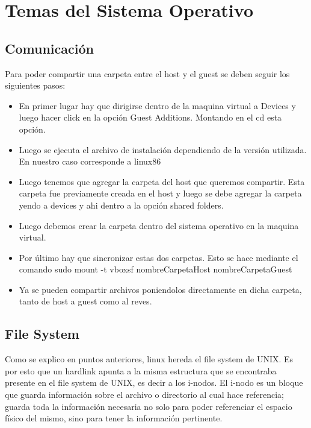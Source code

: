 \documentclass[a4paper, 12pt]{article}
\begin{document}
\section*{Temas del Sistema Operativo}

\subsection*{Comunicaci\'on}

Para poder compartir una carpeta entre el host y el guest se deben seguir los siguientes pasos:

\begin{itemize}
\item En primer lugar hay que dirigirse dentro de la maquina virtual a Devices y luego hacer click en la opci\'on Guest Additions. Montando en el cd esta opci\'on.
\item Luego se ejecuta el archivo de instalaci\'on dependiendo de la versi\'on utilizada. En nuestro caso corresponde a linux86
\item Luego tenemos que agregar la carpeta del host que queremos compartir. Esta carpeta fue previamente creada en el host y luego se debe agregar la carpeta yendo a devices y ahi dentro a la opci\'on shared folders. 
\item Luego debemos crear la carpeta dentro del sistema operativo en la maquina virtual.
\item Por \'ultimo hay que sincronizar estas dos carpetas. Esto se hace mediante el comando sudo mount -t vboxsf nombreCarpetaHost nombreCarpetaGuest
\item Ya se pueden compartir archivos poniendolos directamente en dicha carpeta, tanto de host a guest como al reves. 
\end{itemize}


\subsection*{File System}

Como se explico en puntos anteriores, linux hereda el file system de UNIX. Es por esto que un hardlink apunta a la misma estructura que se encontraba presente en el file system de UNIX, es decir a los i-nodos. El i-nodo es un bloque que guarda informaci\'on sobre el archivo o directorio al cual hace referencia; guarda toda la informaci\'on necesaria no solo para poder referenciar el espacio f\'isico del mismo, sino para tener la informaci\'on pertinente. 
\end{document}
